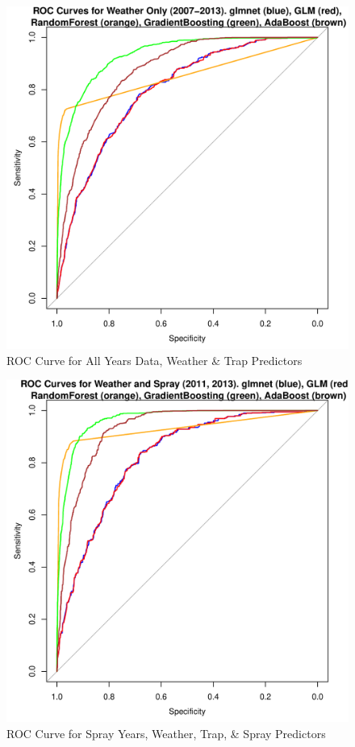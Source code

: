 \documentclass[12pt]{article}
\begin{document}
\begin{figure}[H] \center
\includegraphics[scale=.50]{ROC_AllYears_Weather.pdf}
\caption*{ROC Curve for All Years Data, Weather \& Trap Predictors}
\end{figure}

\begin{figure}[H] \center
\includegraphics[scale=.50]{ROC_SprayYears_SprayWeather.pdf}
\caption*{ROC Curve for Spray Years, Weather, Trap, \& Spray Predictors}
\end{figure}
\end{document}
